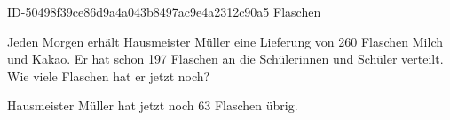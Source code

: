 \begin{exercise}
      {ID-50498f39ce86d9a4a043b8497ac9e4a2312c90a5}
      {Flaschen}
  \ifproblem\problem\par
    Jeden Morgen erhält Hausmeister Müller eine Lieferung von \num{260} Flaschen
    Milch und Kakao. Er hat schon \num{197} Flaschen an die Schülerinnen und Schüler
    verteilt. Wie viele Flaschen hat er jetzt noch?
  \fi
  \ifoutcome\outcome\par
    Hausmeister Müller hat jetzt noch \num{63} Flaschen übrig.
  \fi
\end{exercise}

